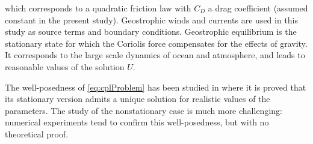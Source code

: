 which corresponds to a quadratic friction law with $C_D$ 
a drag coefficient (assumed constant in the present study).
%
%
Geostrophic winds and currents are used in this study as
source terms and boundary conditions. 
Geostrophic equilibrium is the stationary state for which the 
Coriolis force compensates for the effects of gravity.
It corresponds to the large scale dynamics of ocean and 
atmosphere, and leads to reasonable values of the solution $U$. \par
The well-posedness of \eqref{eq:cplProblem} has been studied in 
\cite{thery_etude_2021}
where it is proved that its stationary version admits a unique solution for realistic values of the parameters. The study of the nonstationary case is much more challenging: numerical experiments tend to confirm this well-posedness, but  with no theoretical proof.
%
%
%
%
%
%
%
%
%
% 
%
%


